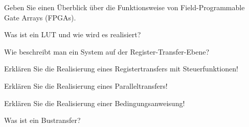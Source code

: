 \documentclass
[
  draft    = true,
  fontsize = 11pt,
  parskip  = half-,
  BCOR     = 0pt,
  DIV      = 11,
  ngerman,
  dvipsnames
]
{scrartcl}
\begin{document}
\begin{mytemize}
  \item Geben Sie einen Überblick über die Funktionsweise von Field-Programmable Gate Arrays (FPGAs).
        \begin{mytemize}
          \item Was ist ein LUT und wie wird es realisiert?
        \end{mytemize}
  \item Wie beschreibt man ein System auf der Register-Transfer-Ebene?
  \item Erklären Sie die Realisierung eines Registertransfers mit Steuerfunktionen!
  \item Erklären Sie die Realisierung eines Paralleltransfers!
  \item Erklären Sie die Realisierung einer Bedingungsanweisung!
  \item Was ist ein Bustransfer?
\end{mytemize}

\end{document}
